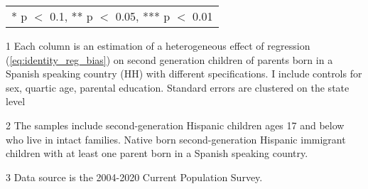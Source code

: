 \begin{table}[H]
{\begin{threeparttable}
\begin{tabular}[t]{lcccccc}
\bottomrule
\multicolumn{7}{l}{\rule{0pt}{1em}* p $<$ 0.1, ** p $<$ 0.05, *** p $<$ 0.01}\\
\end{tabular}
\begin{tablenotes}
\small
\item[1] \footnotesize{Each column is an estimation of a heterogeneous effect of regression (\ref{eq:identity_reg_bias}) on
                      second generation children of parents born in a Spanish speaking country (HH) with different specifications. 
                      I include controls for sex, quartic age, parental education.
                      Standard errors are clustered on the state level}
\item[2] \footnotesize{The samples include second-generation Hispanic children ages 17 and below who live in intact families. 
                      Native born second-generation Hispanic 
                      immigrant children with at least one parent born in a Spanish speaking 
                      country.}
\item[3] \footnotesize{Data source is the 2004-2020 Current Population Survey.}
\end{tablenotes}
\end{threeparttable}}
\end{table}
